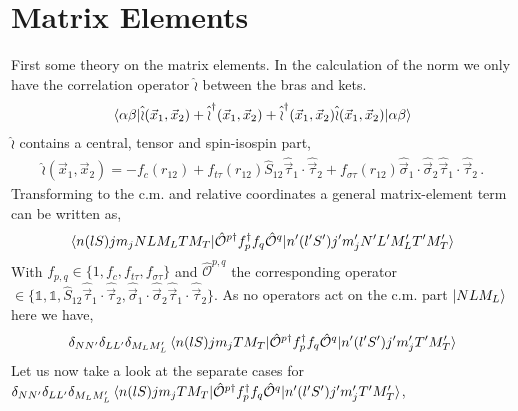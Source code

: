 \documentclass[10pt]{article}
\begin{document}
\section{Matrix Elements}
First some theory on the matrix elements. In the calculation of the norm we only have the correlation operator $\hat{\wr}$ between the bras and kets.
\begin{align*}
	\braket{ \alpha \beta |\hat{\wr}(\vec{x}_{1},\vec{x}_{2}) + \hat{\wr}^{\dagger}(\vec{x}_{1},\vec{x}_{2}) + \hat{\wr}^{\dagger}(\vec{x}_{1},\vec{x}_{2})\hat{\wr}(\vec{x}_{1},\vec{x}_{2}) | \alpha \beta}
\end{align*}
$\hat{\wr}$ contains a central, tensor and spin-isospin part,
\begin{align*}
	\hat{\wr}(\vec{x}_{1},\vec{x}_{2}) = -f_c(r_{12}) + f_{t\tau}(r_{12}) \hat{S}_{12} \hat{\vec{\tau}}_{1} \cdot \hat{\vec{\tau}}_{2} + f_{\sigma \tau}(r_{12}) \hat{ \vec{\sigma}}_{1} \cdot \hat{ \vec{\sigma}}_{2} \hat{ \vec{\tau}}_{1} \cdot \hat{ \vec{\tau}}_{2}  \, .
\end{align*}
Transforming to the c.m. and relative coordinates a general matrix-element term can be written as,
\begin{align*}
	\braket{ n (l S) j m_j N L M_L T M_T |  \hat{\mathcal{O}}^{p\dagger} f^{\dagger}_{p} f_{q} \hat{\mathcal{O}}^{q} | n' (l' S') j' m_j' N' L' M_L' T' M_T'} 
\end{align*}
With $f_{p,q} \in \{ 1, f_{c}, f_{t\tau}, f_{\sigma \tau} \}$ and $\hat{\mathcal{O}}^{p,q}$ the corresponding operator $\in \{ \mathbb{1}, \mathbb{1},  \hat{S}_{12} \hat{\vec{\tau}}_{1} \cdot \hat{\vec{\tau}}_{2}, \hat{ \vec{\sigma}}_{1} \cdot \hat{ \vec{\sigma}}_{2} \hat{ \vec{\tau}}_{1} \cdot \hat{ \vec{\tau}}_{2} \} $.
As no operators act on the c.m. part $ \ket{ N L M_L}$ here we have,
\begin{align*}
	\delta_{NN'} \delta_{LL'} \delta_{M_L M_L'} \braket{ n (l S) j m_j T M_T |  \hat{\mathcal{O}}^{p\dagger} f^{\dagger}_{p} f_{q} \hat{\mathcal{O}}^{q} | n' (l' S') j' m_j' T' M_T'}  
\end{align*}
Let us now take a look at the separate cases for $\delta_{NN'} \delta_{LL'} \delta_{M_L M_L'} \braket{ n (l S) j m_j T M_T |  \hat{\mathcal{O}}^{p\dagger} f^{\dagger}_{p} f_{q} \hat{\mathcal{O}}^{q} | n' (l' S') j' m_j' T' M_T'} $,
\end{document}
